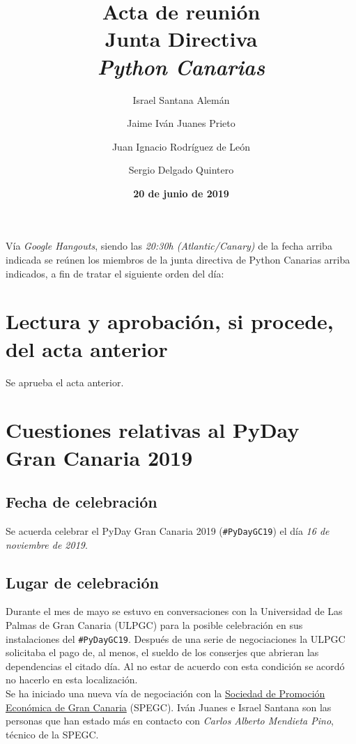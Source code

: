 \documentclass[a4paper, 12pt]{article}
\title{\huge \textbf{Acta de reunión} \\ Junta Directiva \\ \textit{Python Canarias}}
\date{\textbf{20 de junio de 2019}}
\author{
    Israel Santana Alemán \and
    Jaime Iván Juanes Prieto \and
    Juan Ignacio Rodríguez de León \and 
    Sergio Delgado Quintero
}
\begin{document}
\renewcommand{\contentsname}{Orden del día}

\maketitle

Vía \textit{Google Hangouts}, siendo las \textit{20:30h (Atlantic/Canary)} de la fecha arriba indicada se reúnen los miembros de la junta directiva de Python Canarias arriba indicados, a fin de tratar el siguiente orden del día:

\tableofcontents

\section{Lectura y aprobación, si procede, del acta anterior}

Se aprueba el acta anterior.

\section{Cuestiones relativas al PyDay Gran Canaria 2019}

\subsection*{Fecha de celebración}

Se acuerda celebrar el PyDay Gran Canaria 2019 (\texttt{\#PyDayGC19}) el día \textit{16 de noviembre de 2019}.

\subsection*{Lugar de celebración}

Durante el mes de mayo se estuvo en conversaciones con la Universidad de Las Palmas de Gran Canaria (ULPGC) para la posible celebración en sus instalaciones del \texttt{\#PyDayGC19}. Después de una serie de negociaciones la ULPGC solicitaba el pago de, al menos, el sueldo de los conserjes que abrieran las dependencias el citado día. Al no estar de acuerdo con esta condición se acordó no hacerlo en esta localización.\\

Se ha iniciado una nueva vía de negociación con la \href{https://www.spegc.org/}{Sociedad de Promoción Económica de Gran Canaria} (SPEGC). Iván Juanes e Israel Santana son las personas que han estado más en contacto con \textit{Carlos Alberto Mendieta Pino}, técnico de la SPEGC.\\
\end{document}
